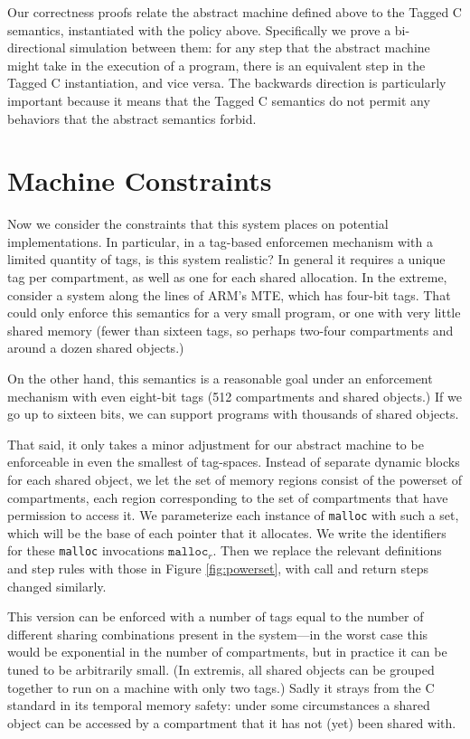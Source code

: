 \documentclass{article}
\begin{document}
Our correctness proofs relate the abstract machine defined above to the Tagged C semantics,
instantiated with the policy above. Specifically we prove a bi-directional simulation between
them: for any step that the abstract machine might take in the execution of a program, there
is an equivalent step in the Tagged C instantiation, and vice versa. The backwards direction
is particularly important because it means that the Tagged C semantics do not permit any
behaviors that the abstract semantics forbid.

\section{Machine Constraints}

Now we consider the constraints that this system places on potential implementations.
In particular, in a tag-based enforcemen mechanism with a limited quantity of tags,
is this system realistic? In general it requires a unique tag per compartment,
as well as one for each shared allocation. In the extreme, consider a system along
the lines of ARM's MTE, which has four-bit tags. That could only enforce this
semantics for a very small program, or one with very little shared memory
(fewer than sixteen tags, so perhaps two-four compartments and around a dozen shared objects.)

On the other hand, this semantics is a reasonable goal under an enforcement mechanism
with even eight-bit tags (512 compartments and shared objects.) If we go up to sixteen
bits, we can support programs with thousands of shared objects.

That said, it only takes a minor adjustment for our abstract machine to be enforceable in even
the smallest of tag-spaces. Instead of separate dynamic blocks for each shared
object, we let the set of memory regions consist of the powerset of compartments,
each region corresponding to the set of compartments that have permission to access it.
We parameterize each instance of {\tt malloc}
with such a set, which will be the base of each pointer that it allocates. We write
the identifiers for these {\tt malloc} invocations \(\mathtt{malloc}_r\).
Then we replace the relevant definitions and step rules with those in
Figure \ref{fig:powerset}, with call and return steps changed similarly.

This version can be enforced with a number of tags equal to the number of different
sharing combinations present in the system---in the worst case this would be
exponential in the number of compartments, but in practice it can be tuned to be
arbitrarily small. (In extremis, all shared objects can be grouped together to run
on a machine with only two tags.) Sadly it strays from the C standard in its
temporal memory safety: under some circumstances a shared object can be accessed
by a compartment that it has not (yet) been shared with.
\end{document}

